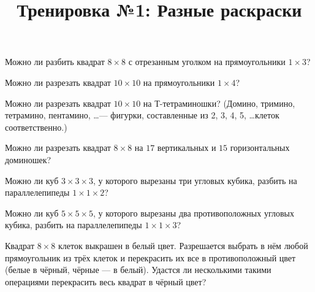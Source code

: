 



\title{Тренировка №1: Разные раскраски}
\maketitle

\begin{problem}
	Можно ли разбить квадрат $8 \times 8$ с отрезанным уголком на прямоугольники $1 \times 3$?

\end{problem}

\begin{problem}
	Можно ли разрезать квадрат $10 \times 10$ на прямоугольники $1 \times 4$?
\end{problem}

\begin{problem}
	Можно ли разрезать квадрат $10 \times 10$ на Т-тетраминошки? (Домино, тримино,
тетрамино, пентамино, \dots --- фигурки, составленные из 2, 3, 4, 5, \dots клеток
соответственно.)
\end{problem}

\begin{problem}
	Можно ли разрезать квадрат $8 \times 8$ на $17$ вертикальных и $15$ горизонтальных доминошек?
\end{problem}

\begin{problem}
	Можно ли куб $3 \times 3 \times 3$, у которого вырезаны три угловых кубика, разбить на параллелепипеды $1 \times 1 \times 2$?
\end{problem}

\begin{problem}
	Можно ли куб $5 \times 5 \times 5$, у которого вырезаны два противоположных угловых кубика, разбить на параллелепипеды $1 \times 1 \times 3$?
\end{problem}

\begin{problem}
	Квадрат $8 \times 8$ клеток выкрашен в белый цвет. Разрешается выбрать в нём любой прямоугольник из трёх клеток и перекрасить их все в противоположный цвет (белые в чёрный, чёрные --- в белый). Удастся ли несколькими такими операциями перекрасить весь квадрат в чёрный цвет?
\end{problem}

